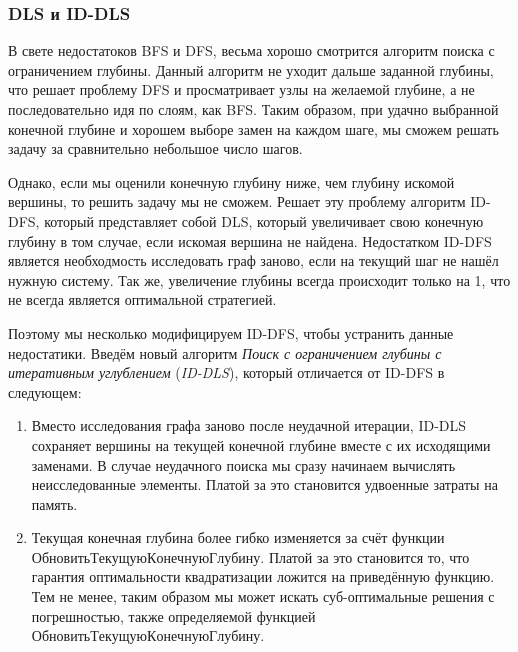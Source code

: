 \subsubsection{DLS и ID-DLS}

В свете недостатоков BFS и DFS, весьма хорошо смотрится алгоритм поиска с ограничением глубины. Данный алгоритм не уходит дальше заданной глубины, что решает проблему DFS и просматривает узлы на желаемой глубине, а не последовательно идя по слоям, как BFS. Таким образом, при удачно выбранной конечной глубине и хорошем выборе замен на каждом шаге, мы сможем решать задачу за сравнительно небольшое число шагов.

Однако, если мы оценили конечную глубину ниже, чем глубину искомой вершины, то решить задачу мы не сможем. Решает эту проблему алгоритм ID-DFS, который представляет собой DLS, который увеличивает свою конечную глубину в том случае, если искомая вершина не найдена. Недостатком ID-DFS является необходмость исследовать граф заново, если на текущий шаг не нашёл нужную систему. Так же, увеличение глубины всегда происходит только на 1, что не всегда является оптимальной стратегией.

Поэтому мы несколько модифицируем ID-DFS, чтобы устранить данные недостатики. Введём новый алгоритм \textit{Поиск с ограничением глубины с итеративным углублением} (\textit{ID-DLS}), который отличается от ID-DFS в следующем:

\begin{enumerate}
    \item Вместо исследования графа заново после неудачной итерации, ID-DLS сохраняет вершины на текущей конечной глубине вместе с их исходящими заменами. В случае неудачного поиска мы сразу начинаем вычислять неисследованные элементы. Платой за это становится удвоенные затраты на память.
    \item Текущая конечная глубина более гибко изменяется за счёт функции $ОбновитьТекущуюКонечнуюГлубину$. Платой за это становится то, что гарантия оптимальности квадратизации ложится на приведённую функцию. Тем не менее, таким образом мы может искать суб-оптимальные решения с погрешностью, также определяемой функцией $ОбновитьТекущуюКонечнуюГлубину$.
\end{enumerate}

